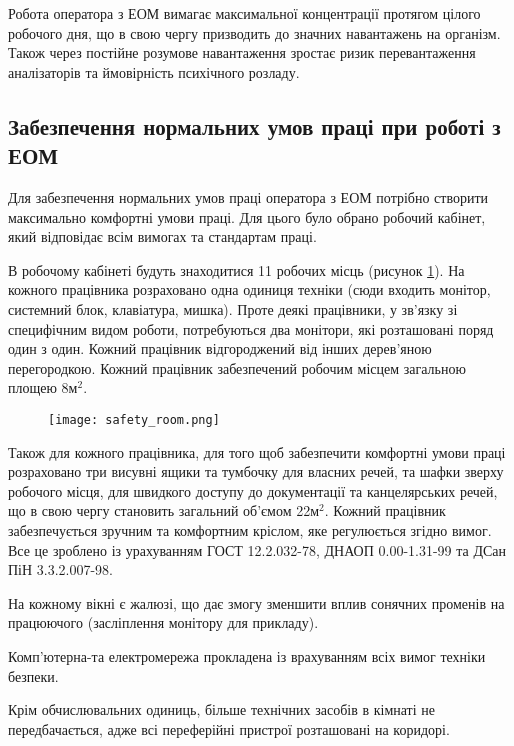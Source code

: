 \par Робота оператора з ЕОМ вимагає максимальної концентрації протягом цілого робочого дня, що в свою чергу призводить до значних навантажень на організм. Також через постійне розумове навантаження зростає ризик перевантаження аналізаторів та ймовірність психічного розладу.



\subsection{Забезпечення нормальних умов праці при роботі з ЕОМ}
\par Для забезпечення нормальних умов праці оператора з ЕОМ потрібно створити максимально комфортні умови праці. Для цього було обрано робочий кабінет, який відповідає всім вимогах та стандартам праці.
\par В робочому кабінеті будуть знаходитися 11 робочих місць (рисунок \ref{pic:safety_room}). На кожного працівника розраховано одна одиниця техніки (сюди входить монітор, системний блок, клавіатура, мишка). Проте деякі працівники, у зв'язку зі специфічним видом роботи, потребуються два монітори, які розташовані поряд один з один. Кожний працівник відгороджений від інших дерев'яною перегородкою. Кожний працівник забезпечений робочим місцем загальною площею 8м$^2$. 

\begin{figure}[!ht]
\centering
		\texttt{[image: safety\_room.png]}
		\label{pic:safety_room}
\end{figure}

\par Також для кожного працівника, для того щоб забезпечити комфортні умови праці розраховано три висувні ящики та тумбочку для власних речей, та шафки зверху робочого місця, для швидкого доступу до документації та канцелярських речей, що в свою чергу становить загальний об'ємом 22м$^2$. Кожний працівник забезпечується зручним та комфортним кріслом, яке регулюється згідно вимог. Все це зроблено із урахуванням ГОСТ 12.2.032-78, ДНАОП 0.00-1.31-99 та ДСан ПіН 3.3.2.007-98.



\par На кожному вікні є жалюзі, що дає змогу зменшити вплив сонячних променів на працюючого (засліплення монітору для прикладу).
\par Комп'ютерна-та електромережа прокладена із врахуванням всіх вимог техніки безпеки.
\par Крім обчислювальних одиниць, більше технічних засобів в кімнаті не передбачається, адже всі переферійні пристрої розташовані на коридорі.

